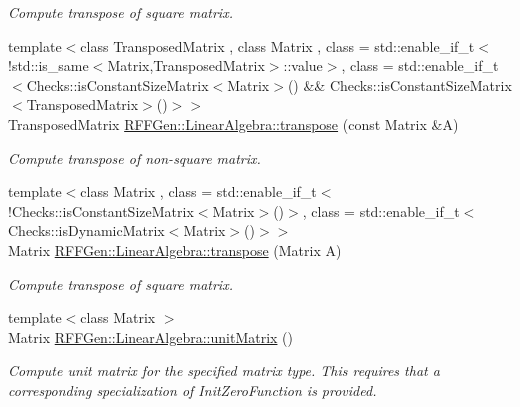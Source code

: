 \begin{DoxyCompactItemize}
\begin{DoxyCompactList}\small\item\em Compute transpose of square matrix. \end{DoxyCompactList}\item 
\hypertarget{group__LinearAlgebraGroup_ga0d90e6ad4304aa185d8dd54c109b1a0c}{{\footnotesize template$<$class Transposed\-Matrix , class Matrix , class  = std\-::enable\-\_\-if\-\_\-t$<$!std\-::is\-\_\-same$<$\-Matrix,\-Transposed\-Matrix$>$\-::value$>$, class  = std\-::enable\-\_\-if\-\_\-t$<$\-Checks\-::is\-Constant\-Size\-Matrix$<$\-Matrix$>$() \&\& Checks\-::is\-Constant\-Size\-Matrix$<$\-Transposed\-Matrix$>$()$>$$>$ }\\Transposed\-Matrix \hyperlink{group__LinearAlgebraGroup_ga0d90e6ad4304aa185d8dd54c109b1a0c}{R\-F\-F\-Gen\-::\-Linear\-Algebra\-::transpose} (const Matrix \&A)}\label{group__LinearAlgebraGroup_ga0d90e6ad4304aa185d8dd54c109b1a0c}

\begin{DoxyCompactList}\small\item\em Compute transpose of non-\/square matrix. \end{DoxyCompactList}\item 
\hypertarget{group__LinearAlgebraGroup_ga21731f4340490258f50b39535b20ffac}{{\footnotesize template$<$class Matrix , class  = std\-::enable\-\_\-if\-\_\-t$<$!\-Checks\-::is\-Constant\-Size\-Matrix$<$\-Matrix$>$()$>$, class  = std\-::enable\-\_\-if\-\_\-t$<$\-Checks\-::is\-Dynamic\-Matrix$<$\-Matrix$>$()$>$$>$ }\\Matrix \hyperlink{group__LinearAlgebraGroup_ga21731f4340490258f50b39535b20ffac}{R\-F\-F\-Gen\-::\-Linear\-Algebra\-::transpose} (Matrix A)}\label{group__LinearAlgebraGroup_ga21731f4340490258f50b39535b20ffac}

\begin{DoxyCompactList}\small\item\em Compute transpose of square matrix. \end{DoxyCompactList}\item 
\hypertarget{group__LinearAlgebraGroup_gad9bd9a5f39d449a0fb84b60b27db17a5}{{\footnotesize template$<$class Matrix $>$ }\\Matrix \hyperlink{group__LinearAlgebraGroup_gad9bd9a5f39d449a0fb84b60b27db17a5}{R\-F\-F\-Gen\-::\-Linear\-Algebra\-::unit\-Matrix} ()}\label{group__LinearAlgebraGroup_gad9bd9a5f39d449a0fb84b60b27db17a5}

\begin{DoxyCompactList}\small\item\em Compute unit matrix for the specified matrix type. This requires that a corresponding specialization of Init\-Zero\-Function is provided. \end{DoxyCompactList}\end{DoxyCompactItemize}


